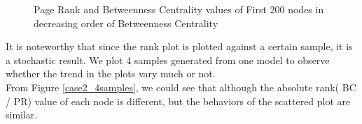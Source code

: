 \documentclass{article}
\begin{document}
\begin{enumerate}
\begin{figure}[!hbtp]
\hfill
{}
\hfill
{}
\hfill
\caption{
\label{case2rankplotBC}%
Page Rank and Betweenness Centrality values of First 200 nodes in decreasing order of Betweenness Centrality}
\end{figure}

\par It is noteworthy that since the rank plot is plotted against a certain sample, it is a stochastic result. We plot 4 samples generated from one model to observe whether the trend in the plots vary much or not. \\
From Figure \ref{case2_4samples}, we could see that although the absolute rank( BC / PR) value of each node is different, but the behaviors of the scattered plot are similar.


\end{enumerate}
\end{document}
